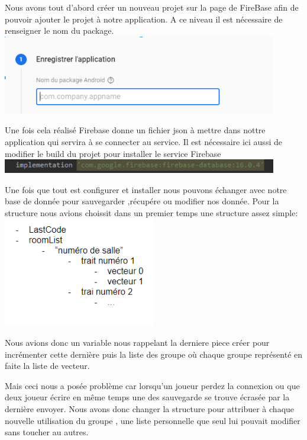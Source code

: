 \documentclass[12pt]{article}
\begin{document}
	\par
	Nous avons tout d’abord créer un nouveau projet sur la page de FireBase afin de pouvoir ajouter le projet à notre application. A ce niveau il est nécessaire de renseigner le nom du package.
	\newline
	\includegraphics[width=0.9\textwidth]{Capture5.png}
	\newline
	\par
	Une fois cela réalisé Firebase donne un fichier json à mettre dans nottre application qui servira à se connecter au service. Il est nécessaire ici aussi de modifier le build du projet pour installer le service Firebase
	\newline
	\includegraphics[width=0.9\textwidth]{Capture4.png}
	\newline
	\par
	Une fois que tout est configurer et installer nous pouvons échanger avec notre base de donnée pour sauvegarder ,récupére ou modifier nos donnée.
	Pour la structure nous avions choissit dans un premier temps une structure assez simple:
	\newline
	\includegraphics[width=0.5\textwidth]{Capture2.png}
	\newline
	\par
	Nous avions donc un variable nous rappelant la derniere piece créer pour incrémenter cette dernière puis la liste des groupe où chaque groupe représenté en faite la liste de vecteur.
	\par
	Mais ceci nous a posée problème car lorsqu'un joueur perdez la connexion ou que deux joueur écrire en même temps une des sauvegarde se trouve écrasée par la dernière envoyer. Nous avons donc changer la structure pour attribuer à chaque nouvelle utilisation du groupe , une liste personnelle que seul lui pouvait modifier sans toucher au autres.
\end{document}
